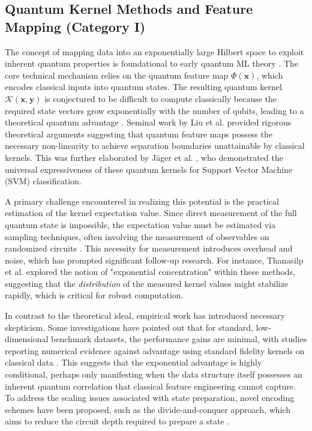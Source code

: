 \documentclass{article}
\begin{document}
\subsection{Quantum Kernel Methods and Feature Mapping (Category I)}

\label{sec:quantum\_kernel\_methods\_and\_feature\_mappi}

The concept of mapping data into an exponentially large Hilbert space to exploit inherent quantum properties is foundational to early quantum ML theory \cite{zeguendry2023quantum}. The core technical mechanism relies on the quantum feature map $\Phi(\mathbf{x})$, which encodes classical inputs into quantum states. The resulting quantum kernel $\mathcal{K}(\mathbf{x}, \mathbf{y})$ is conjectured to be difficult to compute classically because the required state vectors grow exponentially with the number of qubits, leading to a theoretical quantum advantage \cite{liu2021rigorous}. Seminal work by Liu et al. \cite{liu2021rigorous} provided rigorous theoretical arguments suggesting that quantum feature maps possess the necessary non-linearity to achieve separation boundaries unattainable by classical kernels. This was further elaborated by Jäger et al. \cite{jager2023universal}, who demonstrated the universal expressiveness of these quantum kernels for Support Vector Machine (SVM) classification.

A primary challenge encountered in realizing this potential is the practical estimation of the kernel expectation value. Since direct measurement of the full quantum state is impossible, the expectation value must be estimated via sampling techniques, often involving the measurement of observables on randomized circuits \cite{haug2023quantum}. This necessity for measurement introduces overhead and noise, which has prompted significant follow-up research. For instance, Thanasilp et al. \cite{thanasilp2024exponential} explored the notion of "exponential concentration" within these methods, suggesting that the \textit{distribution} of the measured kernel values might stabilize rapidly, which is critical for robust computation.

In contrast to the theoretical ideal, empirical work has introduced necessary skepticism. Some investigations have pointed out that for standard, low-dimensional benchmark datasets, the performance gains are minimal, with studies reporting numerical evidence against advantage using standard fidelity kernels on classical data \cite{slattery2023numerical}. This suggests that the exponential advantage is highly conditional, perhaps only manifesting when the data structure itself possesses an inherent quantum correlation that classical feature engineering cannot capture. To address the scaling issues associated with state preparation, novel encoding schemes have been proposed, such as the divide-and-conquer approach, which aims to reduce the circuit depth required to prepare a state \cite{araujo2021divideandconquer}.
\end{document}
